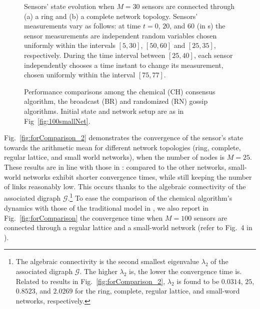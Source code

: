 \documentclass[journal]{IEEEtran}
\begin{document}
\begin{figure}[t]
 \centering
\caption{{Sensors' state evolution when $M=30$ sensors are connected through (a) a ring and (b) a complete network topology. Sensors' measurements vary as follows: at time $t=0$, $20$, and $60$ (in s) the sensor measurements are independent random variables chosen uniformly within the intervals $[5, 30]$, $[50, 60]$ and $[25, 35]$, respectively. During the time interval between $[25,40]$, each sensor independently chooses a time instant to change its measurement, chosen uniformly within the interval $[75, 77]$.}}
\label{fig:simulFullRun}
\end{figure}


\begin{figure}[t]
 \centering
\caption{{Performance comparisons among the chemical (CH) consensus algorithm, the broadcast (BR) and randomized (RN) gossip algorithms. Initial state and network setup are as in Fig~\ref{fig:100smallNet}.}}
\label{fig:compImpl}
\end{figure}



{{Fig.~\ref{fig:forComparison_2} demonstrates the convergence of the sensor's state towards} the arithmetic mean for different network topologies (ring, complete, regular lattice, and small world networks), when the number of nodes is $M=25$. 
These results are in line with those in \cite{OlFa07}: compared to the other networks, small-world networks exhibit shorter convergence times, while still keeping the number of links reasonably low. This occurs thanks to the algebraic connectivity of the associated digraph $\mathcal G$.\footnote{The algebraic connectivity is the second smallest eigenvalue $\lambda_2$ of the associated digraph $\mathcal G$. The higher $\lambda_2$ is, the lower the convergence time is. Related to results in Fig.~\ref{fig:forComparison_2}, $\lambda_2$ is found to be $ 0.0314$, $25$, $0.8523$, and $2.0269$ for the ring, complete, regular lattice, and small-word networks, respectively.} To ease the comparison of the chemical algorithm's dynamics with those of the traditional model in \cite{OlFa07}, we also report in Fig.~\ref{fig:forComparison} the convergence time when $M=100$ sensors are connected through a regular lattice and a small-world network (refer to Fig.~4 in \cite{OlFa07}).}
\end{document}
